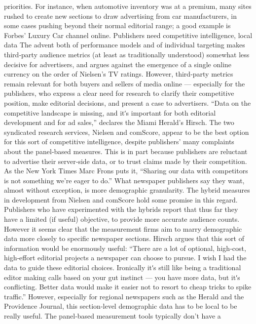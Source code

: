 priorities. For instance, when automotive inventory was at a premium,
many sites rushed to create new sections to draw advertising from car
manufacturers, in some cases pushing beyond their normal editorial
range; a good example is Forbes’ Luxury Car channel online.
Publishers need competitive intelligence, local data
The advent both of performance models and of individual targeting
makes third‐party audience metrics (at least as traditionally understood)
somewhat less decisive for advertisers, and argues against the emergence
of a single online currency on the order of Nielsen’s TV ratings.
However, third‐party metrics remain relevant for both buyers and sellers
of media online — especially for the publishers, who express a clear need
for research to clarify their competitive position, make editorial decisions,
and present a case to advertisers. ``Data on the competitive landscape is
missing, and itʹs important for both editorial development and for ad
sales,'' declares the Miami Herald’s Hirsch.
The two syndicated research services, Nielsen and comScore, appear to be
the best option for this sort of competitive intelligence, despite publishers’
many complaints about the panel‐based measures. This is in part because
publishers are reluctant to advertise their server‐side data, or to trust
claims made by their competition. As the New York Times Marc Frons puts
it, ``Sharing our data with competitors is not something we’re eager to
do.''
What newspaper publishers say they want, almost without exception, is
more demographic granularity. The hybrid measures in development
from Nielsen and comScore hold some promise in this regard. Publishers
who have experimented with the hybrids report that thus far they have a
limited (if useful) objective, to provide more accurate audience counts.
However it seems clear that the measurement firms aim to marry
demographic data more closely to specific newspaper sections. Hirsch
argues that this sort of information would be enormously useful:
``There are a lot of optional, high‐cost, high‐effort editorial projects
a newspaper can choose to pursue. I wish I had the data to guide
these editorial choices. Ironically itʹs still like being a traditional
editor making calls based on your gut instinct — you have more
data, but itʹs conflicting. Better data would make it easier not to
resort to cheap tricks to spike traffic.''
However, especially for regional newspapers such as the Herald and the
Providence Journal, this section‐level demographic data has to be local to be
really useful. The panel‐based measurement tools typically don’t have a

